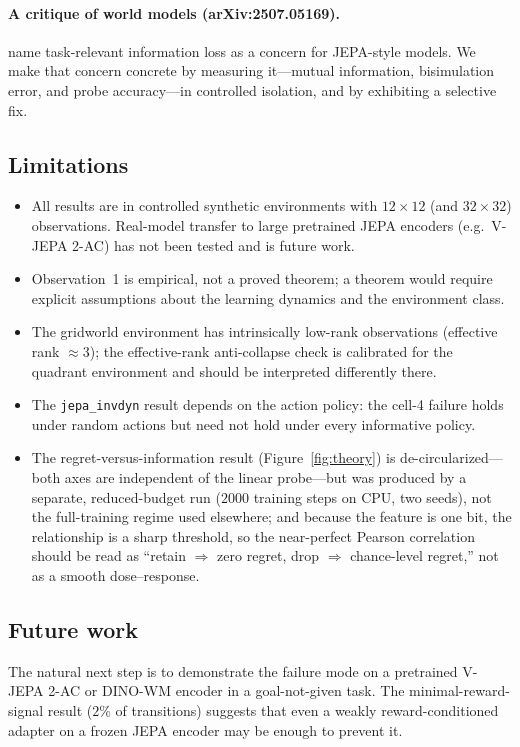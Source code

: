 \documentclass[11pt]{article}
\begin{document}
\paragraph{A critique of world models (arXiv:2507.05169).}
\citet{xing2025critique} name task-relevant information loss as a concern for JEPA-style models. We
make that concern concrete by measuring it---mutual information, bisimulation error, and probe
accuracy---in controlled isolation, and by exhibiting a selective fix.

\subsection{Limitations}
\label{sec:limits}
\begin{itemize}
  \item All results are in controlled synthetic environments with $12\times12$ (and $32\times32$)
  observations. Real-model transfer to large pretrained JEPA encoders (e.g.\ V-JEPA 2-AC) has not
  been tested and is future work.
  \item Observation~1 is empirical, not a proved theorem; a theorem would require explicit
  assumptions about the learning dynamics and the environment class.
  \item The gridworld environment has intrinsically low-rank observations (effective rank
  $\approx3$); the effective-rank anti-collapse check is calibrated for the quadrant environment
  and should be interpreted differently there.
  \item The \texttt{jepa\_invdyn} result depends on the action policy: the cell-4 failure holds
  under random actions but need not hold under every informative policy.
  \item The regret-versus-information result (Figure~\ref{fig:theory}) is de-circularized---both
  axes are independent of the linear probe---but was produced by a separate, reduced-budget run
  ($2000$ training steps on CPU, two seeds), not the full-training regime used elsewhere; and
  because the feature is one bit, the relationship is a sharp threshold, so the near-perfect Pearson
  correlation should be read as ``retain $\Rightarrow$ zero regret, drop $\Rightarrow$ chance-level
  regret,'' not as a smooth dose--response.
\end{itemize}

\subsection{Future work}
The natural next step is to demonstrate the failure mode on a pretrained V-JEPA 2-AC or DINO-WM
encoder in a goal-not-given task. The minimal-reward-signal result ($2\%$ of transitions) suggests
that even a weakly reward-conditioned adapter on a frozen JEPA encoder may be enough to prevent it.
\end{document}
